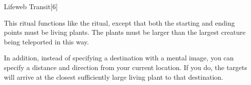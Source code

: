 \begin{spellsection}{Lifeweb Transit}[6]

\begin{spellcontent}

\begin{spelltargetinginfo}



\end{spelltargetinginfo}


\begin{spelleffects}



\spelleffect
This ritual functions like the  ritual, except that both the starting and ending points must be living plants.
The plants must be larger than the largest creature being teleported in this way.

In addition, instead of specifying a destination with a mental image, you can specify a distance and direction from your current location.
If you do, the targets will arrive at the closest sufficiently large living plant to that destination.








\end{spelleffects}

\end{spellcontent}
\begin{spellfooter}


\end{spellfooter}
\begin{spellsubcontent}


\end{spellsubcontent}
\end{spellsection}


